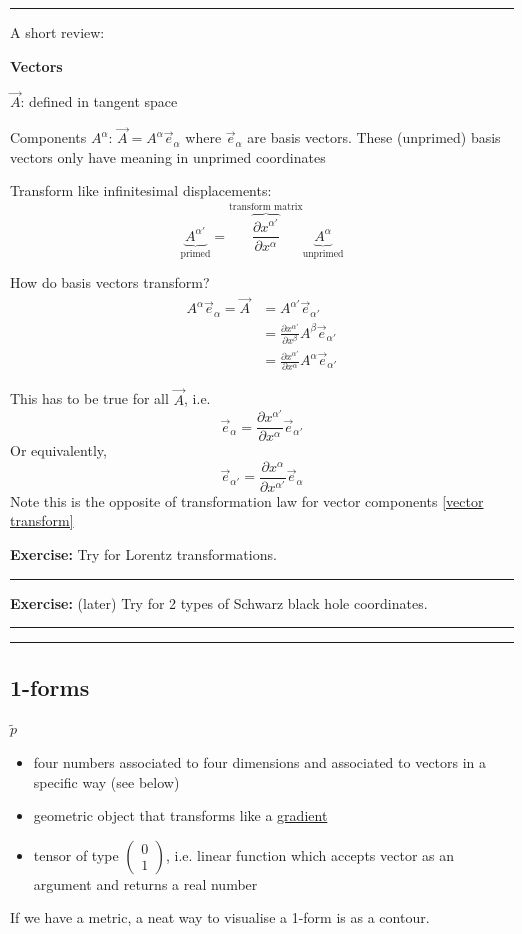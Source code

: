 \documentclass[a4paper]{article} %
\newcommand{\exercise}[2]
{
\begin{framed}
\textbf{Exercise:} #1 \\\hrule
#2
\end{framed}
}
\newcommand{\review}[1]
{
\hrule
A short review:

#1
\hrule
}
\newcommand{\pmx}[1]{
\begin{pmatrix}
#1
\end{pmatrix}
}
\begin{document}
\review{\textbf{Vectors}

$\vec{A}$: defined in tangent space

Components $A^\alpha$: $\vec{A}=A^\alpha \vec{e}_{\alpha}$ where $\vec{e}_{\alpha}$ are basis vectors. These (unprimed) basis vectors only have meaning in unprimed coordinates

Transform like infinitesimal displacements:
\begin{equation}
\underbrace{A^{\alpha'}}_{\text{primed}}=\overbrace{\frac{\partial x^{\alpha'}}{\partial x^{\alpha}}}^{\text{transform matrix}}\underbrace{A^{\alpha}}_{\text{unprimed}}\label{vector transform}
\end{equation}

How do basis vectors transform?
\begin{align*}
A^{\alpha}\vec{e}_\alpha=\vec{A}&=A^{\alpha'}\vec{e}_{\alpha'}\\
&=\frac{\partial x^{\alpha'}}{\partial x^{\beta}}A^{\beta}\vec{e}_{\alpha'}	\\
&=\frac{\partial x^{\alpha'}}{\partial x^{\alpha}}A^{\alpha}\vec{e}_{\alpha'}
\end{align*}

This has to be true for all $\vec{A}$, i.e.
\begin{equation}
\vec{e}_{\alpha}=\frac{\partial x^{\alpha'}}{\partial x^{\alpha}}\vec{e}_{\alpha'}
\end{equation}
Or equivalently,
\begin{equation}
\vec{e}_{\alpha'}=\frac{\partial x^{\alpha}}{\partial x^{\alpha'}}\vec{e}_{\alpha}
\end{equation}
Note this is the opposite of transformation law for vector components \ref{vector transform}

\exercise{Try for Lorentz transformations.}{}
\exercise{(later) Try for 2 types of Schwarz black hole coordinates.}{}

}

\subsection{1-forms}
$\widetilde{p}$
\begin{itemize}
\item four numbers associated to four dimensions and associated to vectors in a specific way (see below)
\item geometric object that transforms like a \underline{gradient}
\item tensor of type $\pmx{0\\1}$, i.e. linear function which accepts vector as an argument and returns a real number
\end{itemize}
If we have a metric, a neat way to visualise a 1-form is as a contour.
\end{document}
